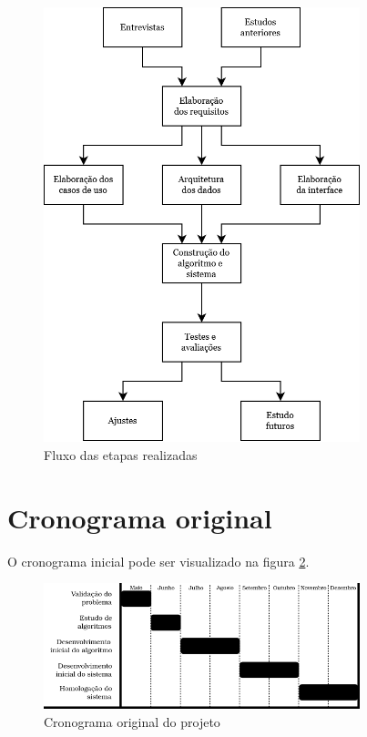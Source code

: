 \begin{figure}[ht]
    \begin{center}
    \includegraphics[width=260pt]{figuras/fluxograma-acao}
    \caption{Fluxo das etapas realizadas}
    \label{fig:fluxograma-acao}
    \end{center}
\end{figure}

\section{Cronograma original}

O cronograma inicial pode ser visualizado na figura \ref{fig:cronograma}.

\begin{figure}[ht]
    \begin{center}
    \includegraphics[width=260pt]{figuras/cronograma}
    \caption{Cronograma original do projeto}
    \label{fig:cronograma}
    \end{center}
\end{figure}

